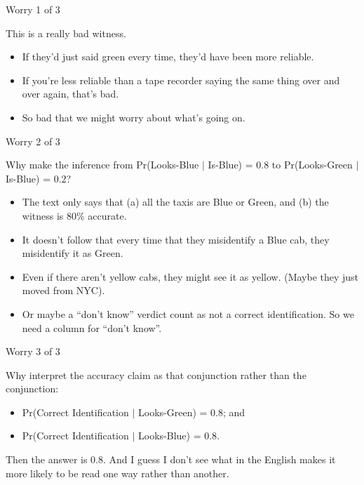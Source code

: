 \documentclass[
  ignorenonframetext,
]{beamer}
\providecommand{\tightlist}{%
  \setlength{\itemsep}{0pt}\setlength{\parskip}{0pt}}
\renewcommand{\,}{\text{, }}
\begin{document}
\begin{frame}{Worry 1 of 3}
\protect\hypertarget{worry-1-of-3}{}

This is a really bad witness.

\begin{itemize}
\tightlist
\item
  If they'd just said green every time, they'd have been more reliable.
\item
  If you're less reliable than a tape recorder saying the same thing
  over and over again, that's bad.
\item
  So bad that we might worry about what's going on.
\end{itemize}

\end{frame}

\begin{frame}{Worry 2 of 3}
\protect\hypertarget{worry-2-of-3}{}

Why make the inference from Pr(Looks-Blue \(|\) Is-Blue) = \(0.8\) to
Pr(Looks-Green \(|\) Is-Blue) = \(0.2\)? \pause

\begin{itemize}
\tightlist
\item
  The text only says that (a) all the taxis are Blue or Green, and (b)
  the witness is 80\% accurate.
\item
  It doesn't follow that every time that they misidentify a Blue cab,
  they misidentify it as Green. \pause
\item
  Even if there aren't yellow cabs, they might see it as yellow. (Maybe
  they just moved from NYC). \pause
\item
  Or maybe a ``don't know'' verdict count as not a correct
  identification. So we need a column for ``don't know''.
\end{itemize}

\end{frame}

\begin{frame}{Worry 3 of 3}
\protect\hypertarget{worry-3-of-3}{}

Why interpret the accuracy claim as that conjunction rather than the
conjunction:

\begin{itemize}
\tightlist
\item
  Pr(Correct Identification \(|\) Looks-Green) = \(0.8\); and
\item
  Pr(Correct Identification \(|\) Looks-Blue) = \(0.8\).
\end{itemize}

Then the answer is 0.8. And I guess I don't see what in the English
makes it more likely to be read one way rather than another.

\end{frame}
\end{document}
